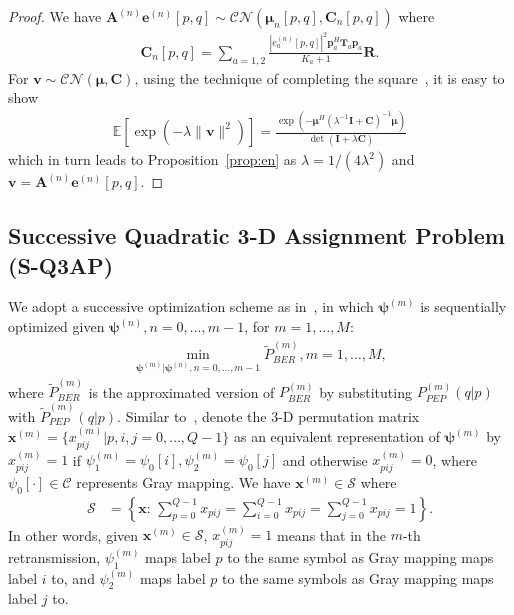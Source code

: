 \documentclass[journal]{IEEEtran}
\begin{document}
\begin{proof}
  We have $\mathbf{A}^{(n)}\mathbf{e}^{(n)}[p,q]
  \sim\mathcal{CN}(\bm{\mu}_n[p,q], \mathbf{C}_n[p,q])$
  where 
  \begin{align}
    \mathbf{C}_n[p,q] = \sum_{a=1,2}
    \frac{|e_a^{(n)}[p,q]|^2\mathbf{p}_a^H\mathbf{T}_a
    \mathbf{p}_a}{K_a+1}\mathbf{R}.
  \end{align}
  For $\mathbf{v}\sim\mathcal{CN}(\bm{\mu}, \mathbf{C})$, using the technique of
  completing the square~\cite[Sec. 2.3.1]{bishop2006pattern}, it is easy to show
  \begin{align}
    \mathbb{E}\left[\exp(-\lambda\|\mathbf{v}\|^2)\right] =
    \frac{\exp\left(-\bm{\mu}^H(\lambda^{-1}\mathbf{I} +
    \mathbf{C})^{-1}\bm{\mu}\right)}{\det(\mathbf{I} +
    \lambda\mathbf{C})} \label{eq:elv2}
  \end{align}
  which in turn leads to Proposition~\ref{prop:en} as $\lambda=1/(4\lambda^2)$
  and $\mathbf{v}=\mathbf{A}^{(n)}\mathbf{e}^{(n)}[p,q]$.
\end{proof}

\subsection{Successive Quadratic 3-D Assignment Problem (S-Q3AP)}
\label{ssec:q3ap}
We adopt a successive optimization scheme as in~\cite{samra2005symbol,
wu2016modulation}, in which $\bm{\psi}^{(m)}$ is sequentially optimized given
$\bm{\psi}^{(n)}, n=0,\ldots,m-1$, for $m=1,\ldots,M$:
\begin{align}
  \min_{\bm{\psi}^{(m)}|\bm{\psi}^{(n)},n=0,\ldots,m-1}\tilde{P}_{BER}^{(m)},m=1,\ldots,M,\label{eq:minber}
\end{align}
where $\tilde{P}_{BER}^{(m)}$ is the approximated version of
$P_{BER}^{(m)}$ by substituting $P_{PEP}^{(m)}(q|p)$ with
$\tilde{P}_{PEP}^{(m)}(q|p)$. Similar to~\cite{wu2016modulation}, denote the 3-D
permutation matrix $\mathbf{x}^{(m)} = \{x_{pij}^{(m)}|p,i,j=0,\ldots,Q-1\}$ as an equivalent
representation of $\bm{\psi}^{(m)}$ by $x_{pij}^{(m)} = 1$ if $
\psi_1^{(m)} = \psi_0[i], \psi_2^{(m)} = \psi_0[j]$ and otherwise $x_{pij}^{(m)} =
0$, where $\psi_0[\cdot]\in\mathcal{C}$ represents Gray mapping. We have
$\mathbf{x}^{(m)}\in\mathcal{S}$ where
\begin{align}
  \mathcal{S} & =
  \left\{\mathbf{x}:\,\sum_{p=0}^{Q-1}x_{pij}= \sum_{i=0}^{Q-1}x_{pij}
  =\sum_{j=0}^{Q-1}x_{pij} =1\right\}.
  \label{eq:constraint}
\end{align}
In other words, given $\mathbf{x}^{(m)}\in \mathcal{S}$, $x_{pij}^{(m)} = 1$
means that in the $m$-th retransmission, $\psi_1^{(m)}$ maps label
$p$ to the same symbol as Gray mapping maps label $i$ to, and $\psi_2^{(m)}$
maps label $p$ to the same symbols as Gray mapping maps label $j$ to.
\end{document}
